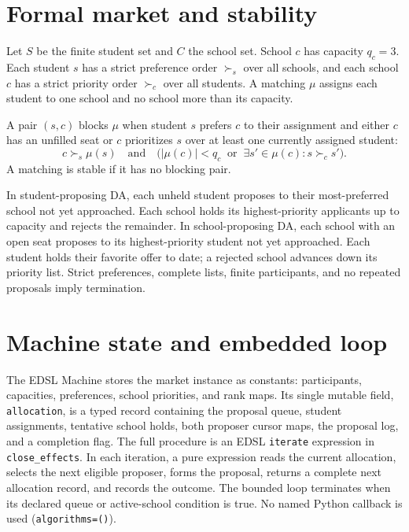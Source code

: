 \documentclass[11pt]{article}
\begin{document}
\section{Formal market and stability}
Let $S$ be the finite student set and $C$ the school set. School $c$ has capacity $q_c=3$. Each student $s$ has a strict preference order $\succ_s$ over all schools, and each school $c$ has a strict priority order $\succ_c$ over all students. A matching $\mu$ assigns each student to one school and no school more than its capacity.

A pair $(s,c)$ blocks $\mu$ when student $s$ prefers $c$ to their assignment and either $c$ has an unfilled seat or $c$ prioritizes $s$ over at least one currently assigned student:
\[
  c \succ_s \mu(s) \quad\text{and}\quad
  \bigl(|\mu(c)|<q_c\;\;\text{or}\;\;\exists s'\in\mu(c):s\succ_c s'\bigr).
\]
A matching is stable if it has no blocking pair.

In student-proposing DA, each unheld student proposes to their most-preferred school not yet approached. Each school holds its highest-priority applicants up to capacity and rejects the remainder. In school-proposing DA, each school with an open seat proposes to its highest-priority student not yet approached. Each student holds their favorite offer to date; a rejected school advances down its priority list. Strict preferences, complete lists, finite participants, and no repeated proposals imply termination.

\section{Machine state and embedded loop}
The EDSL Machine stores the market instance as constants: participants, capacities, preferences, school priorities, and rank maps. Its single mutable field, \texttt{allocation}, is a typed record containing the proposal queue, student assignments, tentative school holds, both proposer cursor maps, the proposal log, and a completion flag. The full procedure is an EDSL \texttt{iterate} expression in \texttt{close\_effects}. In each iteration, a pure expression reads the current allocation, selects the next eligible proposer, forms the proposal, returns a complete next allocation record, and records the outcome. The bounded loop terminates when its declared queue or active-school condition is true. No named Python callback is used (\texttt{algorithms=()}).
\end{document}

